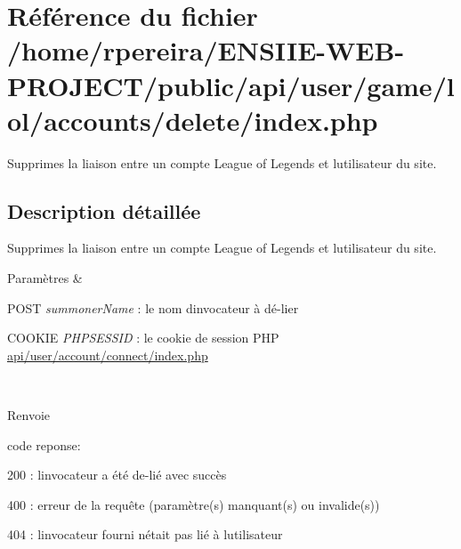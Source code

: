 \hypertarget{user_2game_2lol_2accounts_2delete_2index_8php}{}\section{Référence du fichier /home/rpereira/\+E\+N\+S\+I\+I\+E-\/\+W\+E\+B-\/\+P\+R\+O\+J\+E\+C\+T/public/api/user/game/lol/accounts/delete/index.php}
\label{user_2game_2lol_2accounts_2delete_2index_8php}


Supprimes la liaison entre un compte League of Legends et l\textquotesingle{}utilisateur du site.  




\subsection{Description détaillée}
Supprimes la liaison entre un compte League of Legends et l\textquotesingle{}utilisateur du site. 


\begin{DoxyParams}{Paramètres}
{\em } & 
\begin{DoxyItemize}
\item P\+O\+ST {\itshape summoner\+Name} \+: le nom d\textquotesingle{}invocateur à dé-\/lier
\item C\+O\+O\+K\+IE {\itshape P\+H\+P\+S\+E\+S\+S\+ID} \+: le cookie de session P\+HP \hyperlink{user_2account_2connect_2index_8php}{api/user/account/connect/index.\+php} 
\end{DoxyItemize}\\
\hline
\end{DoxyParams}
\begin{DoxyReturn}{Renvoie}

\begin{DoxyItemize}
\item code reponse\+:
\begin{DoxyItemize}
\item 200 \+: l\textquotesingle{}invocateur a été de-\/lié avec succès
\item 400 \+: erreur de la requête (paramètre(s) manquant(s) ou invalide(s))
\item 404 \+: l\textquotesingle{}invocateur fourni n\textquotesingle{}était pas lié à l\textquotesingle{}utilisateur 
\end{DoxyItemize}
\end{DoxyItemize}
\end{DoxyReturn}
